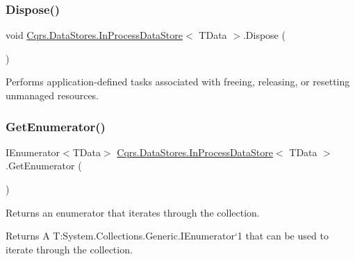 \subsubsection{\texorpdfstring{Dispose()}{Dispose()}}
{\footnotesize\ttfamily void \hyperlink{classCqrs_1_1DataStores_1_1InProcessDataStore}{Cqrs.\+Data\+Stores.\+In\+Process\+Data\+Store}$<$ T\+Data $>$.Dispose (\begin{DoxyParamCaption}{ }\end{DoxyParamCaption})}



Performs application-\/defined tasks associated with freeing, releasing, or resetting unmanaged resources. 

\mbox{\label{classCqrs_1_1DataStores_1_1InProcessDataStore_a867c2badec9f0669cf70257f5572b701}} 
\subsubsection{\texorpdfstring{Get\+Enumerator()}{GetEnumerator()}}
{\footnotesize\ttfamily I\+Enumerator$<$T\+Data$>$ \hyperlink{classCqrs_1_1DataStores_1_1InProcessDataStore}{Cqrs.\+Data\+Stores.\+In\+Process\+Data\+Store}$<$ T\+Data $>$.Get\+Enumerator (\begin{DoxyParamCaption}{ }\end{DoxyParamCaption})}



Returns an enumerator that iterates through the collection. 

\begin{DoxyReturn}{Returns}
A T\+:\+System.\+Collections.\+Generic.\+I\+Enumerator`1 that can be used to iterate through the collection. 
\end{DoxyReturn}
\mbox{\label{classCqrs_1_1DataStores_1_1InProcessDataStore_a43a93c614a403181e0641106ca9509d6}} 

